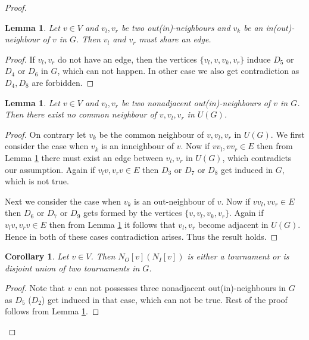 \documentclass{article}
\newtheorem{cor}[thm]{Corollary}
\newtheorem{lem}[thm]{Lemma}
\theoremstyle{definition}
\numberwithin{equation}{section}
\begin{document}
\begin{proof}
\begin{lem}\label{lem1}
Let $v\in V$ and $v_{l},v_{r}$ be two out(in)-neighbours and $v_{k}$ be an in(out)-neighbour of $v$ in $G$. Then $v_{l}$ and $v_{r}$ must share an edge.
\end{lem}

\begin{proof}
If $v_{l},v_{r}$ do not have an edge, then the vertices $\{v_{l},v,v_{k},v_{r}\}$ induce $D_{5}$ or $D_{4}$ or $D_{6}$ in $G$, which can not happen. In other case we also get contradiction as $D_{4}, D_{8}$ are forbidden.
\end{proof}



\begin{lem}\label{lem2}
Let $v\in V$ and $v_{l},v_{r}$ be two nonadjacent out(in)-neighbours of $v$ in $G$. Then there exist no common neighbour of $v,v_{l},v_{r}$ in $U(G)$.
\end{lem}

\begin{proof}
On contrary let $v_{k}$ be the common neighbour of $v,v_{l},v_{r}$ in $U(G)$. We first consider the case when $v_{k}$ is an inneighbour of $v$. Now if $vv_{l},vv_{r}\in E$ then from Lemma \ref{lem1} there must exist an edge between $v_{l},v_{r}$ in $U(G)$, which contradicts our assumption. Again if $v_{l}v,v_{r}v\in E$ then $D_{3}$ or $D_{7}$ or $D_{8}$ get induced in $G$, which is not true.

\noindent Next we consider the case when $v_{k}$ is an out-neighbour of $v$. Now if $vv_{l},vv_{r}\in E$ then $D_{6}$ or $ D_{7}$ or $D_{9}$ gets formed by the vertices $\{v,v_{l},v_{k},v_{r}\}$. Again if $v_{l}v,v_{r}v\in E$ then from Lemma \ref{lem1} it follows that $v_{l},v_{r}$ become adjacent in $U(G)$. Hence in both of these cases contradiction arises. Thus the result holds.
\end{proof}

\begin{cor}\label{corl1}
Let $v\in V$. Then $N_{O}[v](N_{I}[v])$ is either a tournament or is disjoint union of two tournaments in $G$.
\end{cor}

\begin{proof}
Note that $v$ can not possesses three nonadjacent out(in)-neighbours in $G$ as $D_{5}$ ($D_{2}$) get induced in that case, which can not be true.
Rest of the proof follows from Lemma \ref{lem2}.
\end{proof}



\end{proof}
\end{document}
